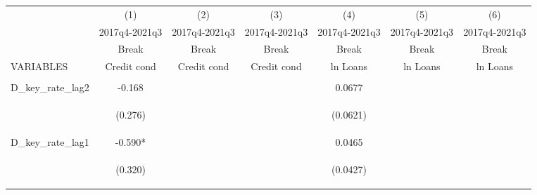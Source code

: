 



\begin{tabular}{lcccccc} \hline
 & (1) & (2) & (3) & (4) & (5) & (6) \\
 & 2017q4-2021q3 & 2017q4-2021q3 & 2017q4-2021q3 & 2017q4-2021q3 & 2017q4-2021q3 & 2017q4-2021q3 \\
 & Break & Break & Break & Break & Break & Break \\
VARIABLES & Credit cond & Credit cond & Credit cond & ln Loans & ln Loans & ln Loans \\ \hline
\vspace{4pt} & \begin{footnotesize}\end{footnotesize} & \begin{footnotesize}\end{footnotesize} & \begin{footnotesize}\end{footnotesize} & \begin{footnotesize}\end{footnotesize} & \begin{footnotesize}\end{footnotesize} & \begin{footnotesize}\end{footnotesize} \\
D\_key\_rate\_lag2 & -0.168 &  &  & 0.0677 &  &  \\
\vspace{4pt} & \begin{footnotesize}(0.276)\end{footnotesize} & \begin{footnotesize}\end{footnotesize} & \begin{footnotesize}\end{footnotesize} & \begin{footnotesize}(0.0621)\end{footnotesize} & \begin{footnotesize}\end{footnotesize} & \begin{footnotesize}\end{footnotesize} \\
D\_key\_rate\_lag1 & -0.590* &  &  & 0.0465 &  &  \\
\vspace{4pt} & \begin{footnotesize}(0.320)\end{footnotesize} & \begin{footnotesize}\end{footnotesize} & \begin{footnotesize}\end{footnotesize} & \begin{footnotesize}(0.0427)\end{footnotesize} & \begin{footnotesize}\end{footnotesize} & \begin{footnotesize}\end{footnotesize} \\

\end{tabular}
